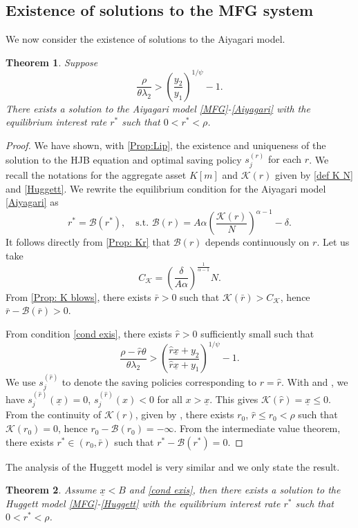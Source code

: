 \documentclass[11pt]{article}
\numberwithin{equation}{section}
\newtheorem{thm}{Theorem}[section]
\theoremstyle{definition}
\newcommand{\ux}{{\underline x}}
\newcommand{\beq}{\begin{equation}}
\newcommand{\eeq}{\end{equation}}
\newcommand{\lc}{\left(}
\newcommand{\rc}{\right)}
\theoremstyle{plain}
\begin{document}
\subsection{Existence of solutions to the MFG system}
We now consider the existence of solutions to the Aiyagari model. 
\begin{thm}
Suppose 
\beq\label{cond exis}
  \frac{\rho}{\theta \lambda_2}>\lc \frac{y_2}{y_1}\rc^{1/\psi}-1.
\eeq
There exists a solution to the Aiyagari model \eqref{MFG}-\eqref{Aiyagari} with the equilibrium interest rate $r^*$ such that $0<r^*<\rho$. 
\end{thm}
\begin{proof}
We have shown, with \cref{Prop:Lip}, the existence and uniqueness of the solution to the HJB equation and optimal saving policy $s_j^{(r)}$ {}{for each $r$}. We recall the notations for the aggregate asset $K[m]$ and $\mathcal{K}(r)$ given by 
\cref{def K N} and \cref{Huggett}. We rewrite the equilibrium condition for the Aiyagari model \eqref{Aiyagari} as 
$$
r^*=\mathcal{B}(r^*),\quad {\text{s.t.}}\,\, \mathcal{B}(r)=A \alpha \left( \frac{\mathcal{K}(r)}{N} \right)^{\alpha - 1} - \delta.
$$
It follows directly from \cref{Prop: Kr} that $\mathcal{B}(r)$ depends continuously on $r$. Let us take 
$$
C_{\mathcal{K}}=\left(\frac{\delta}{A\alpha}\right)^{\frac{1}{\alpha-1}}N.
$$ 
From \cref{Prop: K blows}, there exists $\bar{r}>0$ such that $\mathcal{K}(\bar{r})>C_{\mathcal{K}}$, hence $\bar{r}-\mathcal{B}(\bar{r})>0$.\par
From condition \eqref{cond exis}, there exists $\hat{r}>0$ sufficiently small such that
{}{
\beq\label{bar r}
 \frac{\rho-\hat{r}\theta}{\theta \lambda_2}> \lc \frac{\hat{r}\ux+y_2}{\hat{r}\ux+y_1}\rc^{1/\psi}-1.
\eeq
}
We use $s^{(\hat{r})}_j$ to denote the saving policies corresponding to $r=\hat{r}$. With  and , we have $s^{(\hat{r})}_j(\ux)=0$, $s^{(\hat{r})}_j(x)< 0$ for all $x>\ux$. This gives $\mathcal{K}(\hat{r})=\ux\leq 0$. From the continuity of $\mathcal{K}(r)$, given by , there exists $r_0$, $\hat{r}\leq r_0<\rho$ such that $\mathcal{K}(r_0)=0$, hence $r_0-\mathcal{B}(r_0)=-\infty$. From the intermediate value theorem, there exists $r^*\in (r_0,\bar{r})$ such that $r^*-\mathcal{B}(r^*)=0$. 
\end{proof}
The analysis of the Huggett model is very similar and we only state the result.  

\begin{thm}\label{Thm: Huggett}
Assume $\ux<B$ and \cref{cond exis}, then there exists a solution to the Huggett model \eqref{MFG}-\eqref{Huggett} with the equilibrium interest rate $r^*$ such that $0<r^*<\rho$. 
\end{thm}
\end{document}
